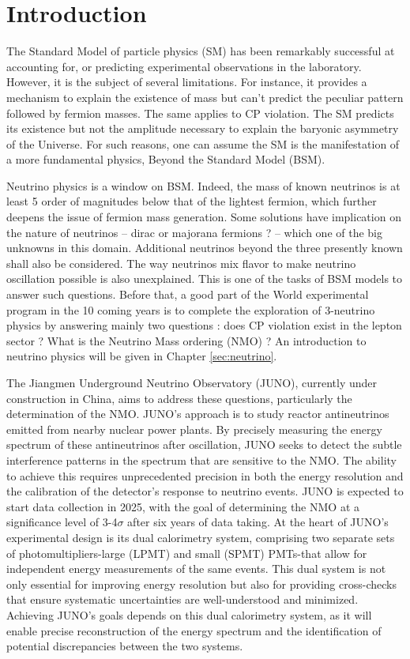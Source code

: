 \chapter*{Introduction}

The Standard Model of particle physics (SM) has been remarkably successful at accounting for, or predicting experimental observations in the laboratory.
However, it is the subject of several limitations. For instance, it provides a mechanism to explain the existence of mass but can't predict the peculiar pattern followed by fermion masses.
The same applies to CP violation. The SM predicts its existence but not the amplitude necessary to explain the baryonic asymmetry of the Universe. For such reasons, one can assume the SM is the manifestation of a more fundamental physics, Beyond the Standard Model (BSM).

Neutrino physics is a window on BSM. Indeed, the mass of known neutrinos is at least 5 order of magnitudes below that of the lightest fermion, which further deepens
the issue of fermion mass generation.
Some solutions have implication on the nature of neutrinos -- dirac or majorana fermions ?  --  which one of the big unknowns in this domain. Additional neutrinos beyond the three presently known shall also be considered. The way neutrinos mix flavor to make neutrino oscillation possible is also unexplained.
This is one of the tasks of BSM models to answer such questions. Before that, a good part of the World experimental program in the 10 coming years is to complete the exploration of 3-neutrino physics by answering mainly two questions :
does CP violation exist in the lepton sector ? What is the Neutrino Mass ordering (NMO) ?
An introduction to neutrino physics will be given in Chapter \ref{sec:neutrino}.

\hfill

The Jiangmen Underground Neutrino Observatory (JUNO), currently under construction in China, aims to address these questions, particularly the determination of the NMO. JUNO's approach is to study reactor antineutrinos emitted from nearby nuclear power plants. By precisely measuring the energy spectrum of these antineutrinos after oscillation, JUNO seeks to detect the subtle interference patterns in the spectrum that are sensitive to the NMO. The ability to achieve this requires unprecedented precision in both the energy resolution and the calibration of the detector's response to neutrino events. JUNO is expected to start data collection in 2025, with the goal of determining the NMO at a significance level of 3-4$\sigma$ after six years of data taking.
At the heart of JUNO's experimental design is its dual calorimetry system, comprising two separate sets of photomultipliers-large (LPMT) and small (SPMT) PMTs-that allow for independent energy measurements of the same events. This dual system is not only essential for improving energy resolution but also for providing cross-checks that ensure systematic uncertainties are well-understood and minimized. Achieving JUNO's goals depends on this dual calorimetry system, as it will enable precise reconstruction of the energy spectrum and the identification of potential discrepancies between the two systems.


